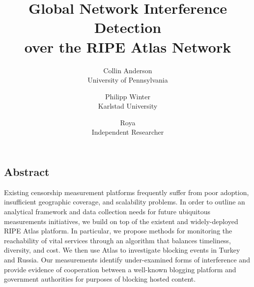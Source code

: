 \documentclass[letterpaper,twocolumn,10pt]{article}
\begin{document}
\date{}

\title{
	\Large \bf Global Network Interference Detection \\
	over the RIPE Atlas Network
}

\author{
	{\rm Collin Anderson} \\
	University of Pennsylvania
	\and
	{\rm Philipp Winter} \\
	Karlstad University
	\and
	{\rm Roya} \\
	Independent Researcher
}

\maketitle

\thispagestyle{empty}

\subsection*{Abstract}

Existing censorship measurement platforms frequently suffer from poor
adoption, insufficient geographic coverage, and scalability problems. In
order to outline an analytical framework and data collection needs for
future ubiquitous measurements initiatives, we build on top of the
existent and widely-deployed RIPE Atlas platform. In particular, we
propose methods for monitoring the reachability of vital services
through an algorithm that balances timeliness, diversity, and cost.  We
then use Atlas to investigate blocking events in Turkey and Russia. Our
measurements identify under-examined forms of interference and provide
evidence of cooperation between a well-known blogging platform and
government authorities for purposes of blocking hosted content.













\raggedright
\printbibliography

\end{document}
